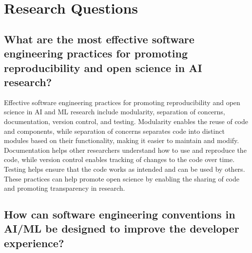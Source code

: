 
\section{Research Questions}


\subsection{
    What are the most effective software engineering practices for promoting reproducibility and open science in AI research?}
    Effective software engineering practices for promoting reproducibility and open science in AI and ML research include modularity, separation of concerns, documentation, version control, and testing. Modularity enables the reuse of code and components, while separation of concerns separates code into distinct modules based on their functionality, making it easier to maintain and modify. Documentation helps other researchers understand how to use and reproduce the code, while version control enables tracking of changes to the code over time. Testing helps ensure that the code works as intended and can be used by others. These practices can help promote open science by enabling the sharing of code and promoting transparency in research.
    
    
    
\subsection{
How can software engineering conventions in AI/ML be designed to improve the developer experience?
}

